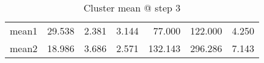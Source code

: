 \begin{table}[htbp]
  \centering
  \caption{Cluster mean @ step 3}
    \begin{tabular}{rrrrrrr}
    \toprule
    mean1 & 29.538  & 2.381  & 3.144  & 77.000  & 122.000  & 4.250  \\
    mean2 & 18.986  & 3.686  & 2.571  & 132.143  & 296.286  & 7.143  \\
    \bottomrule
    \end{tabular}%
  \label{tab:mean_a3}%
\end{table}%

